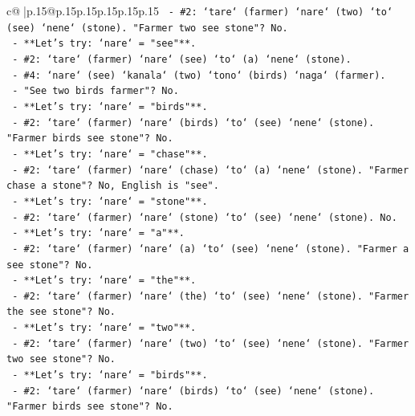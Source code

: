 \documentclass{article}
\begin{document}
{\begin{supertabular}{c@{$\;$}|p{.15\linewidth}@{}p{.15\linewidth}p{.15\linewidth}p{.15\linewidth}p{.15\linewidth}p{.15\linewidth}}
{{{\texttt{                             {-} \#2: `tare` (farmer) `nare` (two) `to` (see) `nene` (stone). "Farmer two see stone"? No.} \\
\texttt{                           {-} **Let's try: `nare` = "see"**.} \\
\texttt{                             {-} \#2: `tare` (farmer) `nare` (see) `to` (a) `nene` (stone).} \\
\texttt{                             {-} \#4: `nare` (see) `kanala` (two) `tono` (birds) `naga` (farmer).} \\
\texttt{                             {-} "See two birds farmer"? No.} \\
\texttt{                           {-} **Let's try: `nare` = "birds"**.} \\
\texttt{                             {-} \#2: `tare` (farmer) `nare` (birds) `to` (see) `nene` (stone). "Farmer birds see stone"? No.} \\
\texttt{                           {-} **Let's try: `nare` = "chase"**.} \\
\texttt{                             {-} \#2: `tare` (farmer) `nare` (chase) `to` (a) `nene` (stone). "Farmer chase a stone"? No, English is "see".} \\
\texttt{                           {-} **Let's try: `nare` = "stone"**.} \\
\texttt{                             {-} \#2: `tare` (farmer) `nare` (stone) `to` (see) `nene` (stone). No.} \\
\texttt{                           {-} **Let's try: `nare` = "a"**.} \\
\texttt{                             {-} \#2: `tare` (farmer) `nare` (a) `to` (see) `nene` (stone). "Farmer a see stone"? No.} \\
\texttt{                           {-} **Let's try: `nare` = "the"**.} \\
\texttt{                             {-} \#2: `tare` (farmer) `nare` (the) `to` (see) `nene` (stone). "Farmer the see stone"? No.} \\
\texttt{                           {-} **Let's try: `nare` = "two"**.} \\
\texttt{                             {-} \#2: `tare` (farmer) `nare` (two) `to` (see) `nene` (stone). "Farmer two see stone"? No.} \\
\texttt{                           {-} **Let's try: `nare` = "birds"**.} \\
\texttt{                             {-} \#2: `tare` (farmer) `nare` (birds) `to` (see) `nene` (stone). "Farmer birds see stone"? No.} \\
}}}
\end{supertabular}}
\end{document}
